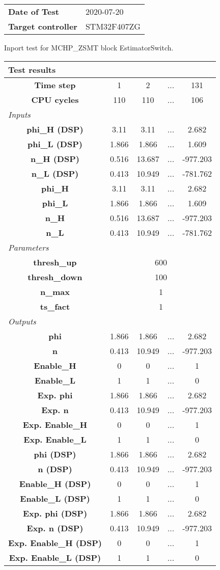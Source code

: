 \begin{tabular}{l l}
\textbf{Date of Test} & 2020-07-20 \tabularnewline
\textbf{Target controller} & STM32F407ZG \tabularnewline
\end{tabular}
\vspace{1ex}
Inport test for MCHP_ZSMT block EstimatorSwitch.

\vspace{1em}
\begin{tabularx}{\textwidth}{|c|c|c|>{\centering\arraybackslash}X|c|}
\hline
\multicolumn{5}{|l|}{\cellcolor[gray]{0.8}\textbf{Test results}} \tabularnewline \hline
\textbf{Time step} & 1 & 2 & ... & 131 \tabularnewline \hline
\textbf{CPU cycles} & 110 & 110 & ... & 106 \tabularnewline \hline
\multicolumn{5}{|l|}{\cellcolor[gray]{0.9}\textit{Inputs}} \tabularnewline \hline
\textbf{phi\_H (DSP)} & 3.11 & 3.11 & ... & 2.682 \tabularnewline \hline
\textbf{phi\_L (DSP)} & 1.866 & 1.866 & ... & 1.609 \tabularnewline \hline
\textbf{n\_H (DSP)} & 0.516 & 13.687 & ... & -977.203 \tabularnewline \hline
\textbf{n\_L (DSP)} & 0.413 & 10.949 & ... & -781.762 \tabularnewline \hline
\textbf{phi\_H} & 3.11 & 3.11 & ... & 2.682 \tabularnewline \hline
\textbf{phi\_L} & 1.866 & 1.866 & ... & 1.609 \tabularnewline \hline
\textbf{n\_H} & 0.516 & 13.687 & ... & -977.203 \tabularnewline \hline
\textbf{n\_L} & 0.413 & 10.949 & ... & -781.762 \tabularnewline \hline
\multicolumn{5}{|l|}{\cellcolor[gray]{0.9}\textit{Parameters}} \tabularnewline \hline
\textbf{thresh\_up} & \multicolumn{4}{c|}{600} \tabularnewline \hline
\textbf{thresh\_down} & \multicolumn{4}{c|}{100} \tabularnewline \hline
\textbf{n\_max} & \multicolumn{4}{c|}{1} \tabularnewline \hline
\textbf{ts\_fact} & \multicolumn{4}{c|}{1} \tabularnewline \hline
\multicolumn{5}{|l|}{\cellcolor[gray]{0.9}\textit{Outputs}} \tabularnewline \hline
\textbf{phi} & 1.866 & 1.866 & ... & 2.682 \tabularnewline \hline
\textbf{n} & 0.413 & 10.949 & ... & -977.203 \tabularnewline \hline
\textbf{Enable\_H} & 0 & 0 & ... & 1 \tabularnewline \hline
\textbf{Enable\_L} & 1 & 1 & ... & 0 \tabularnewline \hline
\textbf{Exp. phi} & 1.866 & 1.866 & ... & 2.682 \tabularnewline \hline
\textbf{Exp. n} & 0.413 & 10.949 & ... & -977.203 \tabularnewline \hline
\textbf{Exp. Enable\_H} & 0 & 0 & ... & 1 \tabularnewline \hline
\textbf{Exp. Enable\_L} & 1 & 1 & ... & 0 \tabularnewline \hline
\textbf{phi (DSP)} & 1.866 & 1.866 & ... & 2.682 \tabularnewline \hline
\textbf{n (DSP)} & 0.413 & 10.949 & ... & -977.203 \tabularnewline \hline
\textbf{Enable\_H (DSP)} & 0 & 0 & ... & 1 \tabularnewline \hline
\textbf{Enable\_L (DSP)} & 1 & 1 & ... & 0 \tabularnewline \hline
\textbf{Exp. phi (DSP)} & 1.866 & 1.866 & ... & 2.682 \tabularnewline \hline
\textbf{Exp. n (DSP)} & 0.413 & 10.949 & ... & -977.203 \tabularnewline \hline
\textbf{Exp. Enable\_H (DSP)} & 0 & 0 & ... & 1 \tabularnewline \hline
\textbf{Exp. Enable\_L (DSP)} & 1 & 1 & ... & 0 \tabularnewline \hline
\end{tabularx}
\vspace{1ex}


